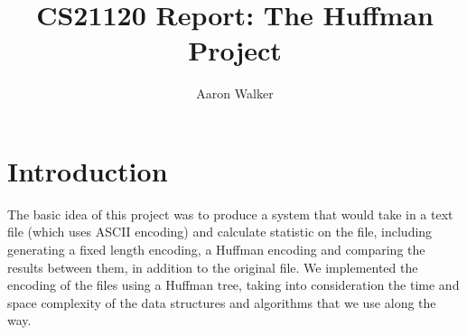 \documentclass[11pt, oneside]{amsart}
\title{CS21120 Report: The Huffman Project}
\author{Aaron Walker}
\begin{document}
\maketitle

\section{Introduction}
The basic idea of this project was to produce a system that would take in a text file (which uses ASCII encoding) and calculate statistic on the file, including generating a fixed length encoding, a Huffman encoding and comparing the results between them, in addition to the original file. We implemented the encoding of the files using a Huffman tree, taking into consideration the time and space complexity of the data structures and algorithms that we use along the way.
\end{document}
